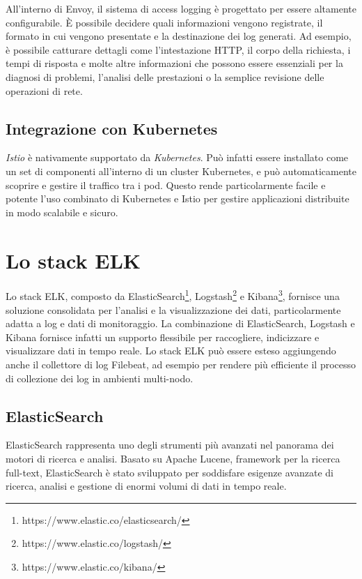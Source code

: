 All'interno di Envoy, il sistema di access logging è progettato per essere altamente configurabile. È possibile decidere quali informazioni vengono registrate, il formato in cui vengono presentate e la destinazione dei log generati. Ad esempio, è possibile catturare dettagli come l'intestazione HTTP, il corpo della richiesta, i tempi di risposta e molte altre informazioni che possono essere essenziali per la diagnosi di problemi, l'analisi delle prestazioni o la semplice revisione delle operazioni di rete.

\subsection{Integrazione con Kubernetes}

\textit{Istio} è nativamente supportato da \textit{Kubernetes}. Può infatti essere installato come un set di componenti all'interno di un cluster Kubernetes, e può automaticamente scoprire e gestire il traffico tra i pod. Questo rende particolarmente facile e potente l'uso combinato di Kubernetes e Istio per gestire applicazioni distribuite in modo scalabile e sicuro.

\section{Lo stack ELK}

Lo stack ELK, composto da ElasticSearch\footnote{https://www.elastic.co/elasticsearch/}, Logstash\footnote{https://www.elastic.co/logstash/} e Kibana\footnote{https://www.elastic.co/kibana/}, fornisce una soluzione consolidata per l'analisi e la visualizzazione dei dati, particolarmente adatta a log e dati di monitoraggio. La combinazione di ElasticSearch, Logstash e Kibana fornisce infatti un supporto flessibile per raccogliere, indicizzare e visualizzare dati in tempo reale. Lo stack ELK può essere esteso aggiungendo anche il collettore di log Filebeat, ad esempio per rendere più efficiente il processo di collezione dei log in ambienti multi-nodo.

\subsection{ElasticSearch}

ElasticSearch rappresenta uno degli strumenti più avanzati nel panorama dei motori di ricerca e analisi. Basato su Apache Lucene, framework per la ricerca full-text, ElasticSearch è stato sviluppato per soddisfare esigenze avanzate di ricerca, analisi e gestione di enormi volumi di dati in tempo reale.

